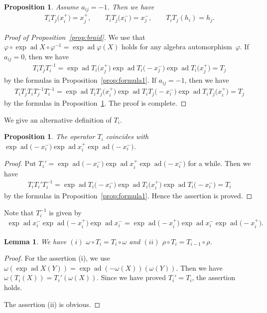 \documentclass[10pt,a4paper]{amsart}
\newtheorem{prop}[thm]{Proposition}
\newtheorem{lem}[thm]{Lemma}
\theoremstyle{definition}
\numberwithin{equation}{section}
\DeclareMathOperator{\ad}{ad}
\begin{document}
\begin{prop}\label{prop:iji_pre}Assume $a_{ij}=-1$. Then we have
\begin{gather*}
T_i T_j \big(x_i^+\big) = x_j^+,\qquad T_i T_j \big(x_i^-\big) = x_j^-,\qquad T_i T_j (h_i) = h_j.
\end{gather*}
\end{prop}

\begin{proof}[Proof of Proposition~\ref{prop:braid}] We use that $\varphi \circ \exp\ad X \circ \varphi^{-1} = \exp \ad \varphi(X)$ holds for any algebra automorphism~$\varphi$. If $a_{ij}=0$, then we have
\begin{gather*}
T_i T_j T_i^{-1} = \exp\ad T_i\big(x_j^+\big) \exp\ad T_i\big({-}x_j^-\big) \exp\ad T_i\big(x_j^+\big) = T_j
\end{gather*}
by the formulas in Proposition~\ref{prop:formula1}. If $a_{ij}=-1$, then we have
\begin{gather*}
T_i T_j T_i T_j^{-1} T_i^{-1} = \exp\ad T_i T_j \big(x_i^+\big) \exp\ad T_i T_j \big({-}x_i^-\big) \exp\ad T_i T_j \big(x_i^+\big) = T_j
\end{gather*}
by the formulas in Proposition~\ref{prop:iji_pre}. The proof is complete.
\end{proof}

We give an alternative definition of $T_i$.
\begin{prop}The operator $T_i$ coincides with $\exp\ad \big({-}x_i^{-}\big) \exp\ad x_i^{+} \exp\ad \big({-}x_i^{-}\big)$.
\end{prop}
\begin{proof}Put $T_i' = \exp\ad \big({-}x_i^{-}\big) \exp\ad x_i^{+} \exp\ad \big({-}x_i^{-}\big)$ for a while. Then we have
\begin{gather*}
T_i T_i' T_i^{-1} = \exp\ad T_i\big({-}x_i^{-}\big) \exp\ad T_i\big(x_i^+\big) \exp\ad T_i\big({-}x_i^{-}\big) = T_i
\end{gather*}
by the formulas in Proposition~\ref{prop:formula1}. Hence the assertion is proved.
\end{proof}

Note that $T_i^{-1}$ is given by
\begin{gather*}
\exp\ad x_i^- \exp\ad \big({-}x_i^+\big) \exp\ad x_i^- = \exp\ad \big({-}x_i^+\big) \exp\ad x_i^- \exp\ad \big({-}x_i^+\big).
\end{gather*}

\begin{lem}\label{lem:rho_omega_and_T} We have $(i)$ $\omega \circ T_i = T_{i} \circ \omega$ and $(ii)$ $\rho \circ T_i = T_{i-1} \circ \rho$.
\end{lem}
\begin{proof}For the assertion (i), we use $\omega (\exp\ad X (Y)) = \exp\ad(-\omega(X))(\omega(Y))$. Then we have $\omega(T_i(X))=T_i'(\omega(X))$. Since we have proved $T_i'=T_i$, the assertion holds.

The assertion (ii) is obvious.
\end{proof}
\end{document}
